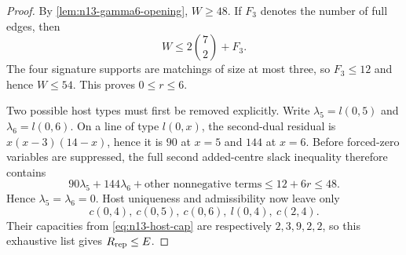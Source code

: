 \begin{proof}
By \cref{lem:n13-gamma6-opening}, $W\geq48$.  If $F_3$ denotes the number
of full edges, then
\[
 W\leq2\binom72+F_3.
\]
The four signature supports are matchings of size at most three, so
$F_3\leq12$ and hence $W\leq54$.  This proves $0\leq r\leq6$.

Two possible host types must first be removed explicitly.  Write
$\lambda_5=l(0,5)$ and $\lambda_6=l(0,6)$.  On a line of type $l(0,x)$,
the second-dual residual is $x(x-3)(14-x)$, hence it is $90$ at $x=5$
and $144$ at $x=6$.  Before forced-zero variables are suppressed, the
full second added-centre slack inequality therefore contains
\[
 90\lambda_5+144\lambda_6+\text{other nonnegative terms}
 \leq12+6r\leq48.
\]
Hence $\lambda_5=\lambda_6=0$.  Host uniqueness and admissibility now leave
only
\[
 c(0,4),\ c(0,5),\ c(0,6),\ l(0,4),\ c(2,4).
\]
Their capacities from \eqref{eq:n13-host-cap} are respectively
$2,3,9,2,2$, so this exhaustive list gives $R_{\rm rep}\leq E$.


\end{proof}
